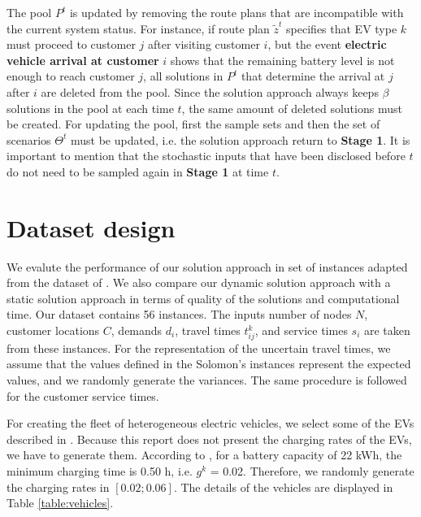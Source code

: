 \documentclass[11pt]{article}
\begin{document}
The pool $P^t$ is updated by removing the route plans that are incompatible with the current system status. For instance, if route plan $\tilde{z}^t$ specifies that EV type $k$ must proceed to customer $j$ after visiting customer $i$, but the event \textbf{electric vehicle arrival at customer} $i$ shows that the remaining battery level is not enough to reach customer $j$, all solutions in $P^t$ that determine the arrival at $j$ after $i$ are deleted from the pool. Since the solution approach always keeps $\beta$ solutions in the pool at each time $t$, the same amount of deleted solutions must be created. For updating the pool, first the sample sets and then the set of scenarios $\Theta^t$ must be updated, i.e. the solution approach return to \textbf{Stage 1}. It is important to mention that the stochastic inputs that have been disclosed before $t$ do not need to be sampled again in \textbf{Stage 1} at time $t$. 



\section{Dataset design}
\label{section:dataset}
We evalute the performance of our solution approach in set of instances adapted from the dataset of \cite{Solomon1987}. We also compare our dynamic solution approach with a static solution approach in terms of quality of the solutions and computational time. Our dataset contains 56 instances. The inputs number of nodes $N$, customer locations $C$, demands $d_i$, travel times $t^k_{ij}$, and service times $s_i$ are taken from these instances. For the representation of the uncertain travel times, we assume that the values defined in the Solomon's instances represent the expected values, and we randomly generate the variances. The same procedure is followed for the customer service times. 

For creating the fleet of heterogeneous electric vehicles, we select some of the EVs described in \cite{mobility2013}. Because this report does not present the charging rates of the EVs, we have to generate them. According to \citep{Montoya2017}, for a battery capacity of 22 kWh, the minimum charging time is 0.50 h, i.e. $g^k$ = 0.02. Therefore, we randomly generate the charging rates in $[0.02;0.06]$. The details of the vehicles are displayed in Table \ref{table:vehicles}.
\end{document}
